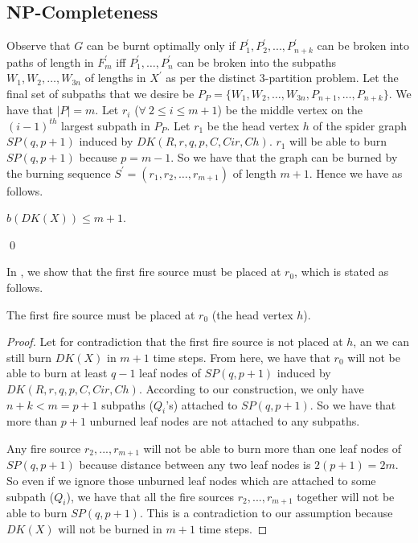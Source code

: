 \subsection{NP-Completeness}

Observe that $G$ can be burnt optimally only if $P_1^\prime, P_2^\prime, ..., P_{n+k}^\prime$ can be broken into paths of length in $F^\prime_m$ iff $P_1^\prime,\dots,P_n^\prime$ can be broken into the subpaths $W_1,W_2,\dots,W_{3n}$ of lengths in $X^\prime$ as per the distinct 3-partition problem.
Let the final set of subpaths that we desire be $P_P=\{W_1,W_2,\dots,W_{3n},P_{n+1},\dots,P_{n+k}\}$. We have that $|P|=m$. Let $r_i$ ($\forall\ 2\leq i\leq m+1$) be the middle vertex on the $(i-1)^{th}$ largest subpath in $P_P$. Let $r_1$ be the head vertex $h$ of the spider graph $SP(q,p+1)$ induced by $DK(R,r,q,p,C,Cir,Ch)$. $r_1$ will be able to burn $SP(q,p+1)$ because $p=m-1$. So we have that the graph can be burned by the burning sequence $S^\prime=(r_1,r_2,\dots,r_{m+1})$ of length $m+1$. Hence we have  as follows.

\begin{lemma}\label{lemma:b(DK(X))-leq-m+1}
    $b(DK(X))\leq m+1$.
\end{lemma}\qed

In , we show that the first fire source must be placed at $r_0$, which is stated as follows.

\begin{lemma}\label{lemma:first-fire-source-BDG}
    The first fire source must be placed at $r_0$ (the head vertex $h$).
\end{lemma}

\begin{proof}
    Let for contradiction that the first fire source is not placed at $h$, an we can still burn $DK(X)$ in $m+1$ time steps. From here, we have that $r_0$ will not be able to burn at least $q-1$ leaf nodes of $SP(q,p+1)$ induced by $DK(R,r,q,p,C,Cir,Ch)$. According to our construction, we only have $n+k<m=p+1$ subpaths ($Q_i$'s) attached to $SP(q,p+1)$. So we have that more than $p+1$ unburned leaf nodes are not attached to any subpaths.
    
    Any fire source $r_2,...,r_{m+1}$ will not be able to burn more than one leaf nodes of $SP(q,p+1)$ because distance between any two leaf nodes is $2(p+1)=2m$. So even if we ignore those unburned leaf nodes which are attached to some subpath ($Q_i$), we have that all the fire sources $r_2,...,r_{m+1}$ together will not be able to burn $SP(q,p+1)$. This is a contradiction to our assumption because $DK(X)$ will not be burned in $m+1$ time steps.
\end{proof}

